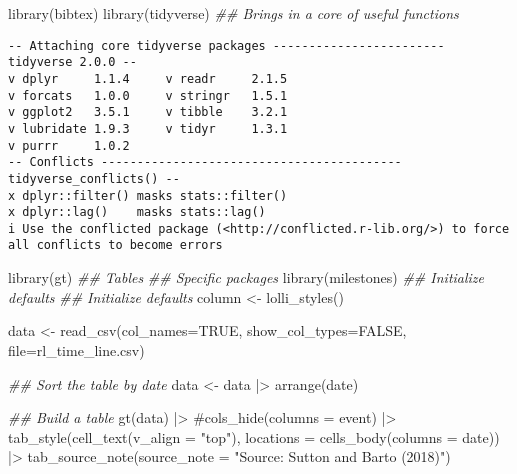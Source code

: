 \documentclass[
  letterpaper,
  DIV=11,
  numbers=noendperiod]{scrreprt}
\newenvironment{Shaded}{\begin{snugshade}}{\end{snugshade}}
\newcommand{\AttributeTok}[1]{\textcolor[rgb]{0.40,0.45,0.13}{#1}}
\newcommand{\CommentTok}[1]{\textcolor[rgb]{0.37,0.37,0.37}{#1}}
\newcommand{\ConstantTok}[1]{\textcolor[rgb]{0.56,0.35,0.01}{#1}}
\newcommand{\DocumentationTok}[1]{\textcolor[rgb]{0.37,0.37,0.37}{\textit{#1}}}
\newcommand{\FunctionTok}[1]{\textcolor[rgb]{0.28,0.35,0.67}{#1}}
\newcommand{\NormalTok}[1]{\textcolor[rgb]{0.00,0.23,0.31}{#1}}
\newcommand{\OtherTok}[1]{\textcolor[rgb]{0.00,0.23,0.31}{#1}}
\newcommand{\SpecialCharTok}[1]{\textcolor[rgb]{0.37,0.37,0.37}{#1}}
\newcommand{\StringTok}[1]{\textcolor[rgb]{0.13,0.47,0.30}{#1}}
\begin{document}
\begin{Shaded}
\begin{Highlighting}[]
\FunctionTok{library}\NormalTok{(bibtex)}
\FunctionTok{library}\NormalTok{(tidyverse) }\DocumentationTok{\#\# Brings in a core of useful functions}
\end{Highlighting}
\end{Shaded}

\begin{verbatim}
-- Attaching core tidyverse packages ------------------------ tidyverse 2.0.0 --
v dplyr     1.1.4     v readr     2.1.5
v forcats   1.0.0     v stringr   1.5.1
v ggplot2   3.5.1     v tibble    3.2.1
v lubridate 1.9.3     v tidyr     1.3.1
v purrr     1.0.2     
-- Conflicts ------------------------------------------ tidyverse_conflicts() --
x dplyr::filter() masks stats::filter()
x dplyr::lag()    masks stats::lag()
i Use the conflicted package (<http://conflicted.r-lib.org/>) to force all conflicts to become errors
\end{verbatim}

\begin{Shaded}
\begin{Highlighting}[]
\FunctionTok{library}\NormalTok{(gt)        }\DocumentationTok{\#\# Tables}
\DocumentationTok{\#\# Specific packages}
\FunctionTok{library}\NormalTok{(milestones)}
\DocumentationTok{\#\# Initialize defaults}
\DocumentationTok{\#\# Initialize defaults}
\NormalTok{column }\OtherTok{\textless{}{-}} \FunctionTok{lolli\_styles}\NormalTok{()}

\NormalTok{data }\OtherTok{\textless{}{-}} \FunctionTok{read\_csv}\NormalTok{(}\AttributeTok{col\_names=}\ConstantTok{TRUE}\NormalTok{, }\AttributeTok{show\_col\_types=}\ConstantTok{FALSE}\NormalTok{, }\AttributeTok{file=}\StringTok{\textquotesingle{}rl\_time\_line.csv\textquotesingle{}}\NormalTok{)}
\end{Highlighting}
\end{Shaded}

\begin{Shaded}
\begin{Highlighting}[]
\DocumentationTok{\#\# Sort the table by date}
\NormalTok{data }\OtherTok{\textless{}{-}}\NormalTok{ data }\SpecialCharTok{|\textgreater{}}
  \FunctionTok{arrange}\NormalTok{(date)}

\DocumentationTok{\#\# Build a table}
\FunctionTok{gt}\NormalTok{(data) }\SpecialCharTok{|\textgreater{}}
  \CommentTok{\#cols\_hide(columns = event) |\textgreater{}}
  \FunctionTok{tab\_style}\NormalTok{(}\FunctionTok{cell\_text}\NormalTok{(}\AttributeTok{v\_align =} \StringTok{"top"}\NormalTok{),}
            \AttributeTok{locations =} \FunctionTok{cells\_body}\NormalTok{(}\AttributeTok{columns =}\NormalTok{ date)) }\SpecialCharTok{|\textgreater{}}
  \FunctionTok{tab\_source\_note}\NormalTok{(}\AttributeTok{source\_note =} \StringTok{"Source: Sutton and Barto (2018)"}\NormalTok{) }
\end{Highlighting}
\end{Shaded}
\end{document}
